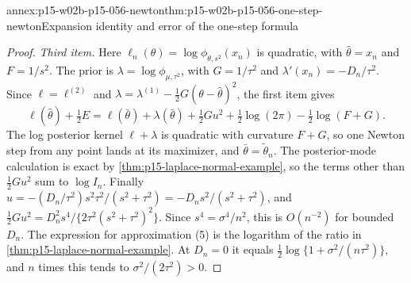 \begin{annexitem}{annex:p15-w02b-p15-056-newton}{thm:p15-w02b-p15-056-one-step-newton}{Expansion identity and error of the one-step formula}
\begin{proof}
\emph{Third item.} Here \(\ell_n(\theta)=\log\phi_{\theta,s^2}(x_n)\)
is quadratic, with \(\widehat\theta=x_n\) and \(F=1/s^2\). The prior is
\(\lambda=\log\phi_{\mu,\tau^2}\), with \(G=1/\tau^2\) and
\(\lambda'(x_n)=-D_n/\tau^2\). Since \(\ell=\ell^{(2)}\) and
\(\lambda=\lambda^{(1)}-\tfrac12G(\theta-\widehat\theta)^2\), the
first item gives
\[
 \ell(\widehat\theta)+\tfrac12E
 =\ell(\bar\theta)+\lambda(\bar\theta)+\tfrac12Gu^2
 +\tfrac12\log(2\pi)-\tfrac12\log(F+G).
\]
The log posterior kernel \(\ell+\lambda\) is quadratic with curvature
\(F+G\), so one Newton step from any point lands at its maximizer, and
\(\bar\theta=\widetilde\theta_n\). The posterior-mode calculation is exact
by \cref{thm:p15-laplace-normal-example}, so the terms other than
\(\tfrac12Gu^2\) sum to \(\log I_n\). Finally
\(u=-(D_n/\tau^2)s^2\tau^2/(s^2+\tau^2)=-D_ns^2/(s^2+\tau^2)\), and
\(\tfrac12Gu^2=D_n^2s^4/\{2\tau^2(s^2+\tau^2)^2\}\). Since
\(s^4=\sigma^4/n^2\), this is \(O(n^{-2})\) for bounded \(D_n\). The
expression for approximation (5) is the logarithm of the ratio in
\cref{thm:p15-laplace-normal-example}. At \(D_n=0\) it equals
\(\tfrac12\log\{1+\sigma^2/(n\tau^2)\}\), and
\(n\) times this tends to \(\sigma^2/(2\tau^2)>0\).
\end{proof}
\end{annexitem}

